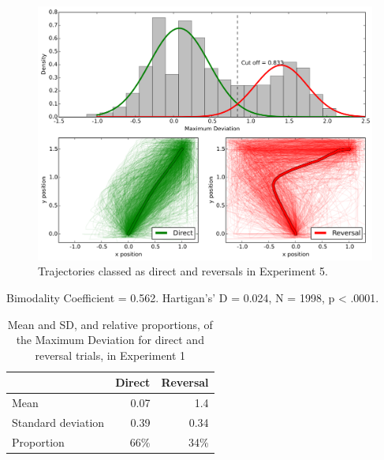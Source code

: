 \begin{figure}[ht]
  \centering
  \includegraphics[width=\textwidth]{imgs/reversals/exp5-reversals}
  \caption[]{
    \label{fig:exp5-reversals}
    Trajectories classed as direct and reversals in Experiment 5.
  }
\end{figure}

Bimodality Coefficient = 0.562.
Hartigan's' D = 0.024, N = 1998, p < .0001.

\begin{table}[hp]
  \centering
  \caption[]{
    Mean and SD, and relative proportions, of the Maximum Deviation for direct and reversal trials, in Experiment 1
    \label{tab:appendix-reversals-5}
  }
  \begin{tabular}{lrr}
    \toprule
    &   Direct &   Reversal \\
    \toprule
    Mean               &     0.07 &             1.4  \\
    Standard deviation &     0.39 &             0.34 \\
    Proportion         &    66\%    &            34\%    \\
    \toprule
  \end{tabular}
\end{table}
